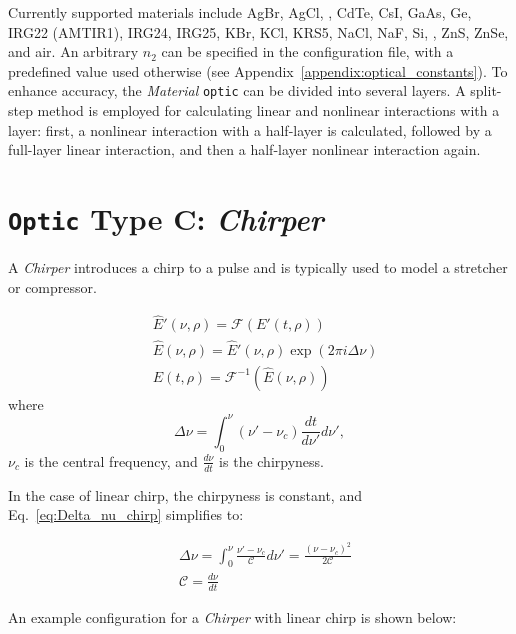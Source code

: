\documentclass{report}
\begin{document}
Currently supported materials include AgBr, AgCl, , CdTe, CsI, GaAs, Ge, IRG22 (AMTIR1), IRG24, IRG25, KBr, KCl, KRS5, NaCl, NaF, Si, , ZnS, ZnSe, and air. An arbitrary \(n_2\) can be specified in the configuration file, with a predefined value used otherwise (see Appendix~\ref{appendix:optical_constants}). To enhance accuracy, the \textit{Material} \texttt{optic} can be divided into several layers. A split-step method is employed for calculating linear and nonlinear interactions with a layer: first, a nonlinear interaction with a half-layer is calculated, followed by a full-layer linear interaction, and then a half-layer nonlinear interaction again.



\section{\texttt{Optic} Type C: \textit{Chirper}}
A \textit{Chirper} introduces a chirp to a pulse and is typically used to model a stretcher or compressor.

\begin{equation}
\begin{aligned}
&\widehat{E}'(\nu,\rho) = \mathcal{F}(E'(t,\rho))\\
&\widehat{E}(\nu,\rho) = \widehat{E}'(\nu,\rho) \exp(2 \pi i \Delta\nu)\\
&E(t,\rho) = \mathcal{F}^{-1}(\widehat{E}(\nu,\rho))
\end{aligned}
\end{equation}
where 
\begin{equation}\label{eq:Delta_nu_chirp}
 \Delta \nu = \int_0^{\nu} (\nu'-\nu_c) \frac{dt}{d\nu'} d\nu',
\end{equation}
\(\nu_c\) is the central frequency, and \(\frac{d\nu}{dt}\) is the chirpyness.

In the case of linear chirp, the chirpyness is constant, and Eq.~\ref{eq:Delta_nu_chirp} simplifies to:

\begin{equation}
\begin{aligned}
&\Delta \nu = \int_0^{\nu} \frac{\nu'-\nu_c}{\mathcal{C}} d\nu' = \frac{(\nu-\nu_c)^2}{2\mathcal{C}}\\
&\mathcal{C} = \frac{d\nu}{dt}
\end{aligned}
\end{equation}

An example configuration for a \textit{Chirper} with linear chirp is shown below:
\end{document}
